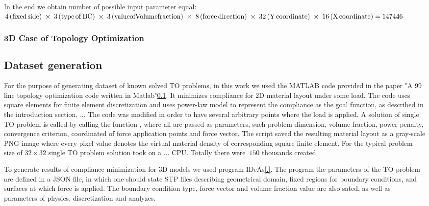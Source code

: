 In the end we obtain number of possible input parameter equal: $4\,\mathrm{(fixed \, side)} \; \times \; 3\,\mathrm{(type \, of \, BC)} \\ \; \times \; 3\,\mathrm{(value of Volume fraction)} \; \times \; 8\,\mathrm{(force \, direction)} \; \times \; 32\,\mathrm{(Y \, coordinate)} \; \times \; 16\,\mathrm{(X \, coordinate)} = 147446$

\subsubsection{3D Case of Topology Optimization}


\subsection{Dataset generation}

For the purpose of generating dataset of known solved TO problems, in this work we used the MATLAB code provided in the paper "A 99 line topology optimization code written in Matlab"\ref{}.
It minimizes compliance for 2D material layout under some load.
The code uses square elements for finite element discretization and uses power-law model to represent the compliance as the goal function, as described in the introduction section.
...
The code was modified in order to have several arbitrary points where the load is applied.
A solution of single TO problem is called by calling the function  , where all are passed as parameters, such problem dimension, volume fraction, power penalty, convergence criterion, coordinated of force application points and force vector. 
The script saved the resulting material layout as a gray-scale PNG image where every pixel value denotes the virtual material density of corresponding square finite element.
For the typical problem size of $ 32 \times 32 $ single TO problem solution took on a ... CPU.
Totally there were $~150$ thousands  created
\medskip


To generate results of compliance minimization for 3D models we used program IDeAs\ref{.}.
The program the parameters of the TO problem are defined in a JSON file, in which one should  state STP files describing geometrical domain, fixed regions for boundary conditions, and surfaces at which force is applied.
The boundary condition type, force vector and volume fraction value are also sated, as well as parameters of physics, discretization and analyzes. 
 


